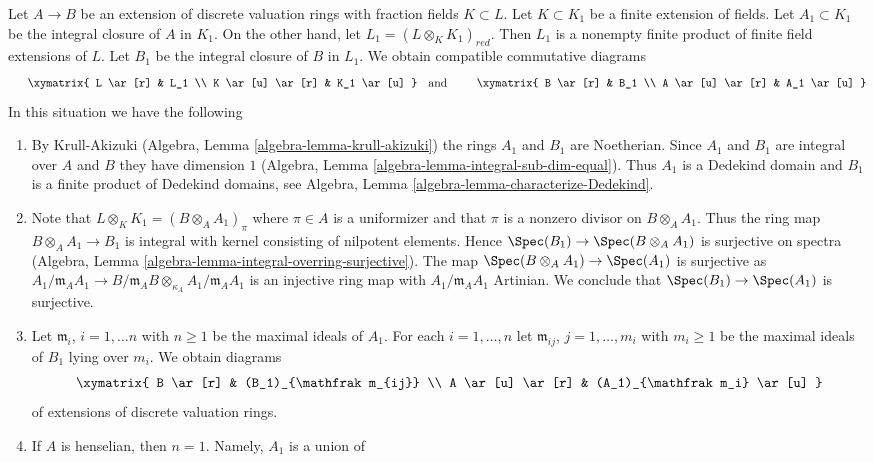 \begin{remark}
\label{remark-construction}
Let $A \to B$ be an extension of discrete valuation rings with fraction
fields $K \subset L$. Let $K \subset K_1$ be a finite extension of
fields. Let $A_1 \subset K_1$ be the integral closure of $A$ in $K_1$.
On the other hand, let $L_1 = (L \otimes_K K_1)_{red}$. Then $L_1$ is a
nonempty finite product of finite field extensions of $L$. Let $B_1$ be
the integral closure of $B$ in $L_1$. We obtain compatible commutative
diagrams
$$
\vcenter{
\xymatrix{
L \ar[r] & L_1 \\
K \ar[u] \ar[r] & K_1 \ar[u]
}
}
\quad\text{and}\quad
\vcenter{
\xymatrix{
B \ar[r] & B_1 \\
A \ar[u] \ar[r] & A_1 \ar[u]
}
}
$$
In this situation we have the following
\begin{enumerate}
\item By Krull-Akizuki (Algebra, Lemma \ref{algebra-lemma-krull-akizuki})
the rings $A_1$ and $B_1$ are Noetherian. Since $A_1$ and $B_1$ are integral
over $A$ and $B$ they have dimension $1$
(Algebra, Lemma \ref{algebra-lemma-integral-sub-dim-equal}).
Thus $A_1$ is a Dedekind domain
and $B_1$ is a finite product of Dedekind domains, see
Algebra, Lemma \ref{algebra-lemma-characterize-Dedekind}.
\item Note that $L \otimes_K K_1 = (B \otimes_A A_1)_\pi$ where $\pi \in A$
is a uniformizer and that $\pi$ is a nonzero divisor on $B \otimes_A A_1$. 
Thus the ring map $B \otimes_A A_1 \to B_1$ is integral with kernel
consisting of nilpotent elements. Hence $\Spec(B_1) \to \Spec(B \otimes_A A_1)$
is surjective on spectra
(Algebra, Lemma \ref{algebra-lemma-integral-overring-surjective}).
The map $\Spec(B \otimes_A A_1) \to \Spec(A_1)$ is surjective as
$A_1/\mathfrak m_A A_1 \to
B/\mathfrak m_AB \otimes_{\kappa_A} A_1/\mathfrak m_A A_1$
is an injective ring map with $A_1/\mathfrak m_A A_1$ Artinian.
We conclude that $\Spec(B_1) \to \Spec(A_1)$ is surjective.
\item Let $\mathfrak m_i$, $i = 1, \ldots n$ with $n \geq 1$ be the
maximal ideals of $A_1$. For each $i = 1, \ldots, n$ let
$\mathfrak m_{ij}$, $j = 1, \ldots, m_i$ with $m_i \geq 1$
be the maximal ideals of $B_1$ lying over $m_i$. We obtain diagrams
$$
\xymatrix{
B \ar[r] & (B_1)_{\mathfrak m_{ij}} \\
A \ar[u] \ar[r] & (A_1)_{\mathfrak m_i} \ar[u]
}
$$
of extensions of discrete valuation rings.
\item If $A$ is henselian, then $n = 1$. Namely, $A_1$ is a union of

\end{enumerate}
\end{remark}
